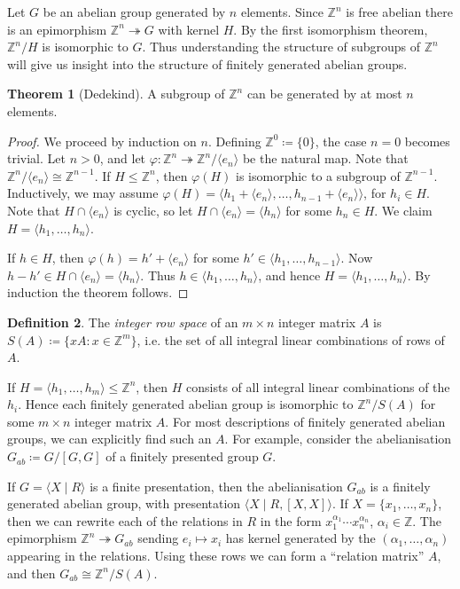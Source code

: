 \documentclass[12pt,a4paper,answers]{exam}
\newcommand{\Z}{\mathbb{Z}}
\theoremstyle{definition}
\newtheorem{theorem}{Theorem}[section]
\newtheorem{definition}[theorem]{Definition}
\begin{document}
Let $G$ be an abelian group generated by $n$ elements. Since $\Z^n$ is free abelian there is an epimorphism $\Z^n\twoheadrightarrow G$ with kernel $H$. By the first isomorphism theorem, $\Z^n/H$ is isomorphic to $G$. Thus understanding the structure of subgroups of $\Z^n$ will give us insight into the structure of finitely generated abelian groups.

\begin{theorem}[Dedekind]
  A subgroup of $\Z^n$ can be generated by at most $n$ elements.
\end{theorem}

\begin{proof}
  We proceed by induction on $n$. Defining $\Z^0\coloneqq\{0\}$, the case $n=0$ becomes trivial. Let $n>0$, and let $\varphi\colon\Z^n\twoheadrightarrow\Z^n/\langle e_n \rangle$ be the natural map. Note that $\Z^n/\langle e_n \rangle\cong\Z^{n-1}$. If $H\leq\Z^n$, then $\varphi(H)$ is isomorphic to a subgroup of $\Z^{n-1}$. Inductively, we may assume $\varphi(H)=\langle h_1 + \langle e_n \rangle, \ldots, h_{n-1} + \langle e_n \rangle \rangle$, for $h_i\in H$. Note that $H\cap\langle e_n \rangle$ is cyclic, so let $H\cap\langle e_n \rangle=\langle h_n \rangle$ for some $h_n\in H$. We claim $H=\langle h_1,\ldots,h_n \rangle$.

  If $h\in H$, then $\varphi(h)=h'+\langle e_n \rangle$ for some $h'\in\langle h_1,\ldots,h_{n-1} \rangle$. Now $h-h'\in H\cap\langle e_n \rangle=\langle h_n \rangle$. Thus $h\in\langle h_1,\ldots,h_n \rangle$, and hence $H=\langle h_1,\ldots,h_n \rangle$. By induction the theorem follows.
\end{proof}

\begin{definition}
  The \emph{integer row space} of an $m\times n$ integer matrix $A$ is $S(A)\coloneqq\{xA : x\in\Z^m\}$, i.e. the set of all integral linear combinations of rows of $A$.
\end{definition}

If $H=\langle h_1,\ldots,h_m \rangle\leq\Z^n$, then $H$ consists of all integral linear combinations of the $h_i$. Hence each finitely generated abelian group is isomorphic to $\Z^n/S(A)$ for some $m\times n$ integer matrix $A$. For most descriptions of finitely generated abelian groups, we can explicitly find such an $A$. For example, consider the abelianisation $G_{ab}\coloneqq G/[G,G]$ of a finitely presented group $G$.

If $G=\langle X \mid R \rangle$ is a finite presentation, then the abelianisation $G_{ab}$ is a finitely generated abelian group, with presentation $\langle X \mid R, [X,X] \rangle$. If $X=\{x_1,\ldots,x_n\}$, then we can rewrite each of the relations in $R$ in the form $x_1^{\alpha_1}\cdots x_n^{\alpha_n}$, $\alpha_i\in\Z$. The epimorphism $\Z^n\twoheadrightarrow G_{ab}$ sending $e_i\mapsto x_i$ has kernel generated by the $(\alpha_1,\ldots,\alpha_n)$ appearing in the relations. Using these rows we can form a ``relation matrix'' $A$, and then $G_{ab}\cong\Z^n/S(A)$.
\end{document}
